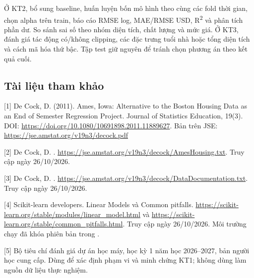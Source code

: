 \documentclass[12pt,a4paper]{article}
\begin{document}
Ở KT2, bổ sung baseline, huấn luyện bốn mô hình theo cùng các fold thời gian, chọn alpha trên train, báo cáo RMSE log, MAE/RMSE USD, R\textsuperscript{2} và phân tích phần dư. So sánh sai số theo nhóm diện tích, chất lượng và mức giá. Ở KT3, đánh giá tác động có/không clipping, các đặc trưng tuổi nhà hoặc tổng diện tích và cách mã hóa thứ bậc. Tập test giữ nguyên để tránh chọn phương án theo kết quả cuối.


\subsection*{Tài liệu tham khảo}

[1] De Cock, D. (2011). Ames, Iowa: Alternative to the Boston Housing Data as an End of Semester Regression Project. Journal of Statistics Education, 19(3). DOI: \url{https://doi.org/10.1080/10691898.2011.11889627}. Bản trên JSE: \url{https://jse.amstat.org/v19n3/decock.pdf}


[2] De Cock, D. . \url{https://jse.amstat.org/v19n3/decock/AmesHousing.txt}. Truy cập ngày 26/10/2026.


[3] De Cock, D. . \url{https://jse.amstat.org/v19n3/decock/DataDocumentation.txt}. Truy cập ngày 26/10/2026.


[4] Scikit-learn developers. Linear Models và Common pitfalls. \url{https://scikit-learn.org/stable/modules/linear_model.html} và \url{https://scikit-learn.org/stable/common_pitfalls.html}. Truy cập ngày 26/10/2026. Môi trường chạy đã khóa phiên bản trong .


[5] Bộ tiêu chí đánh giá dự án học máy, học kỳ 1 năm học 2026–2027, bản người học cung cấp. Dùng để xác định phạm vi và minh chứng KT1; không dùng làm nguồn dữ liệu thực nghiệm.
\end{document}
